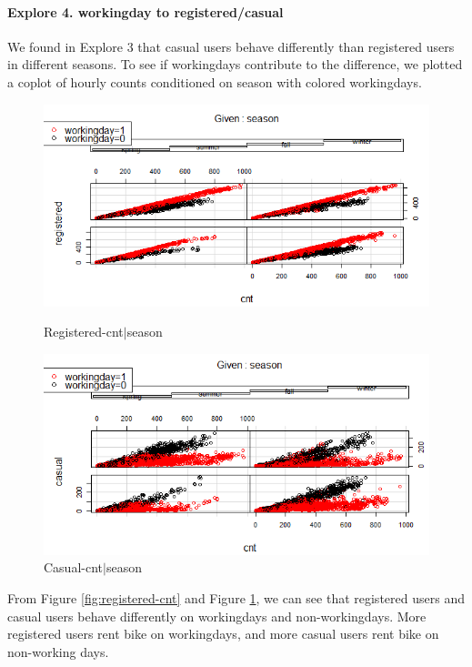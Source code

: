 \documentclass[12pt]{article}
\begin{document}
	\paragraph*{Explore 4. workingday to registered/casual}
	We found in Explore 3 that casual users behave differently than registered users in different seasons. To see if workingdays contribute to the difference, we plotted a coplot of hourly counts conditioned on season with colored workingdays.
	 \begin{figure}[H]
	 	\centering
	 	\begin{minipage}{.5\textwidth}
	 		\centering
	 		\includegraphics[width=\linewidth]{figures/registered_cnt_season.png}
	 		\caption{Registered-cnt$|$season}
	 		\label{fig:registered-cnt}
	 	\end{minipage}%
	 	\begin{minipage}{.5\textwidth}
	 		\centering
	 		\includegraphics[width=\linewidth]{figures/casual_cnt_season.png}
	 		\caption{Casual-cnt$|$season}
	 		\label{fig:casual-cnt}
	 	\end{minipage}
	 \end{figure}
	 From Figure \ref{fig:registered-cnt} and Figure \ref{fig:casual-cnt}, we can see that registered users and casual users behave differently on workingdays and non-workingdays. More registered users rent bike on workingdays, and more casual users rent bike on non-working days.
\end{document}
